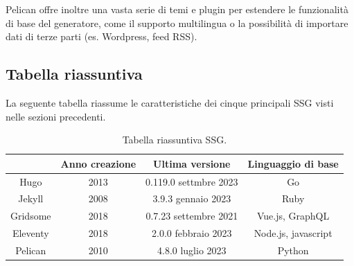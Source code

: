 \documentclass[target=bach,aauheader=]{thud}
\begin{document}
Pelican offre inoltre una vasta serie di temi e plugin per estendere le funzionalità di base del generatore, come il supporto multilingua o la possibilità di importare dati di terze parti (es. Wordpress, feed RSS).

\subsection{Tabella riassuntiva}
La seguente tabella riassume le caratteristiche dei cinque principali SSG visti nelle sezioni precedenti.

\begin{table}[h]
    \centering
    \renewcommand{\arraystretch}{1.5}
    \begin{tabular}{|c|c|c|c|}
    \hline
     & Anno creazione & Ultima versione & Linguaggio di base \\
    \hline
    Hugo & 2013 & 0.119.0 settmbre 2023 & Go \\
    \hline
    Jekyll & 2008 & 3.9.3 gennaio 2023 & Ruby \\
    \hline
    Gridsome & 2018 & 0.7.23 settembre 2021 & Vue.js, GraphQL \\
    \hline
    Eleventy & 2018 & 2.0.0 febbraio 2023 & Node.js, javascript \\
    \hline
    Pelican & 2010 & 4.8.0 luglio 2023 & Python \\
    \hline
    \end{tabular}
    \caption{Tabella riassuntiva SSG.}
    \end{table}

\end{document}
